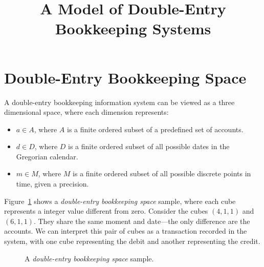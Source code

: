\documentclass{article}
\begin{document}
\title{A Model of Double-Entry Bookkeeping Systems}
\author{}
\date{}
\maketitle

\section{Double-Entry Bookkeeping Space}

A double-entry bookkeeping information system can be viewed as a three dimensional space,
where each dimension represents:

\begin{itemize}
	\item $a \in A$, where $A$ is a finite ordered subset of a predefined set of accounts.
	\item $d \in D$, where $D$ is a finite ordered subset of all 
		possible dates in the Gregorian calendar.
	\item $m \in M$, where $M$ is a finite ordered subset of all 
		possible discrete points in time, given a precision.
\end{itemize}

Figure~\ref{fig:deb-space-sample} shows a \emph{double-entry bookkeeping space} sample, 
where each cube represents a integer value different from zero.
Consider the cubes $(4,1,1)$ and $(6,1,1)$. They share the same moment 
and date---the only difference are the accounts. 
We can interpret this pair of cubes as a transaction recorded in the system,
with one cube representing the debit and another representing the credit.

\begin{figure}[h]
\centering
{}
\label{fig:deb-space-sample}
\caption{A \emph{double-entry bookkeeping space} sample.}
\end{figure}
\end{document}

